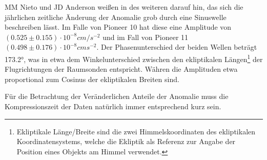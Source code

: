 MM Nieto und JD Anderson weißen in \cite{Nieto2005} des weiteren darauf hin, das sich die jährlichen zeitliche Änderung der Anomalie %
grob durch eine Sinuswelle beschreiben lässt. Im Falle von Pioneer 10 hat diese eine Amplitude von $(0.525\pm0.155)\cdot10^{-8}cm/s^{-2}$ und im Fall von Pioneer 11 $(0.498\pm0.176)\cdot10^{-8}cms^{-2}$. Der Phasenunterschied der beiden Wellen beträgt 173.2°, was in etwa dem Winkelunterschied zwischen den ekliptikalen Längen\footnote{Ekliptikale Länge/Breite sind die zwei Himmelskoordinaten des ekliptikalen Koordinatensystems, welche die Ekliptik als Referenz zur Angabe der Position eines Objekts am Himmel verwendet.} der Flugrichtungen der Raumsonden entspricht. Währen die Amplituden etwa proportional zum Cosinus der ekliptikalen Breiten sind.

Für die Betrachtung der Veränderlichen Anteile der Anomalie muss die Kompressionszeit der Daten natürlich immer entsprechend kurz sein.\cite{Nieto2005}